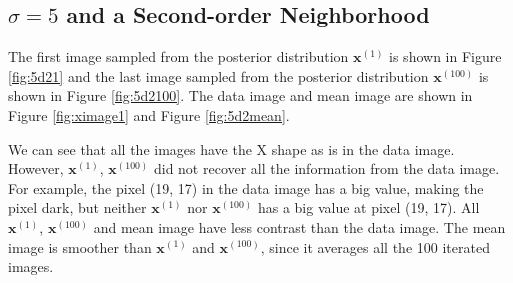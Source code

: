 \subsection{\boldmath$\sigma=5$ and a Second-order Neighborhood}
The first image sampled from the posterior distribution $\mathbf{x}^{(1)}$ is shown in Figure \ref{fig:5d21} and the last image sampled from the posterior distribution $\mathbf{x}^{(100)}$ is shown in Figure \ref{fig:5d2100}. 
The data image and mean image are shown in Figure \ref{fig:ximage1} and Figure \ref{fig:5d2mean}.

We can see that all the images have the X shape as is in the data image.
However, $\mathbf{x}^{(1)}$, $\mathbf{x}^{(100)}$ did not recover all the information from the data image. 
For example, the pixel (19, 17) in the data image has a big value, making the pixel dark, but neither $\mathbf{x}^{(1)}$ nor $\mathbf{x}^{(100)}$ has a big value at pixel (19, 17). 
All $\mathbf{x}^{(1)}$, $\mathbf{x}^{(100)}$ and mean image have less contrast than the data image. 
The mean image is smoother than $\mathbf{x}^{(1)}$ and $\mathbf{x}^{(100)}$, since it averages all the 100 iterated images.
